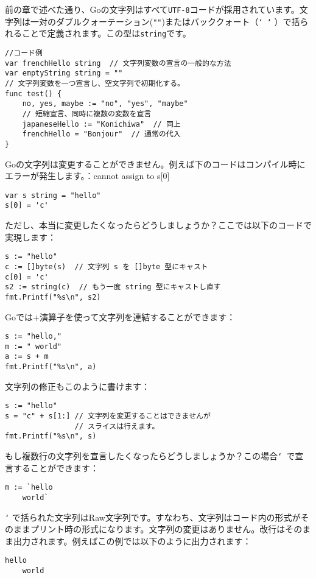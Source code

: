 前の章で述べた通り、Goの文字列はすべて\texttt{UTF-8}コードが採用されています。文字列は一対のダブルクォーテーション(\texttt{""})またはバッククォート（\texttt{` `} ）で括られることで定義されます。この型は\texttt{string}です。

\begin{lstlisting}[numbers=none]
//コード例
var frenchHello string  // 文字列変数の宣言の一般的な方法
var emptyString string = ""
// 文字列変数を一つ宣言し、空文字列で初期化する。
func test() {
    no, yes, maybe := "no", "yes", "maybe"
    // 短縮宣言、同時に複数の変数を宣言
    japaneseHello := "Konichiwa"  // 同上
    frenchHello = "Bonjour"  // 通常の代入
}
\end{lstlisting}

Goの文字列は変更することができません。例えば下のコードはコンパイル時にエラーが発生します。：cannot assign to s[0]

\begin{lstlisting}[numbers=none]
var s string = "hello"
s[0] = 'c'
\end{lstlisting}

ただし、本当に変更したくなったらどうしましょうか？ここでは以下のコードで実現します：

\begin{lstlisting}[numbers=none]
s := "hello"
c := []byte(s)  // 文字列 s を []byte 型にキャスト
c[0] = 'c'
s2 := string(c)  // もう一度 string 型にキャストし直す
fmt.Printf("%s\n", s2)
\end{lstlisting}

Goでは+演算子を使って文字列を連結することができます：

\begin{lstlisting}[numbers=none]
s := "hello,"
m := " world"
a := s + m
fmt.Printf("%s\n", a)
\end{lstlisting}

文字列の修正もこのように書けます：

\begin{lstlisting}[numbers=none]
s := "hello"
s = "c" + s[1:] // 文字列を変更することはできませんが
                // スライスは行えます。
fmt.Printf("%s\n", s)
\end{lstlisting}

もし複数行の文字列を宣言したくなったらどうしましょうか？この場合\texttt{` }で宣言することができます：

\begin{lstlisting}[numbers=none]
m := `hello
    world`
\end{lstlisting}

\texttt{`} で括られた文字列はRaw文字列です。すなわち、文字列はコード内の形式がそのままプリント時の形式になります。文字列の変更はありません。改行はそのまま出力されます。例えばこの例では以下のように出力されます：

\begin{lstlisting}[numbers=none]
hello
    world
\end{lstlisting}

